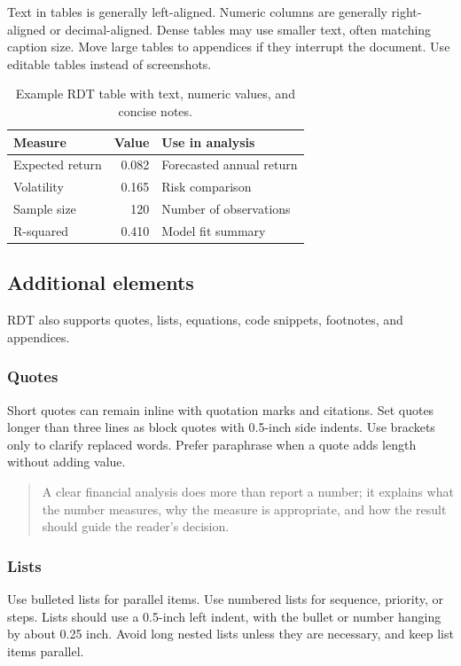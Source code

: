 \documentclass[11pt,letterpaper]{article}
\newenvironment{rdtblockquote}{\begin{quote}}{\end{quote}}
\begin{document}
Text in tables is generally left-aligned. Numeric columns are generally
right-aligned or decimal-aligned. Dense tables may use smaller text,
often matching caption size. Move large tables to appendices if they
interrupt the document. Use editable tables instead of screenshots.

\begin{table}[h]
\caption{Example RDT table with text, numeric values, and concise notes.}
\centering
\begin{tabular}{l r l}
\toprule
Measure & Value & Use in analysis \\
\midrule
Expected return & 0.082 & Forecasted annual return \\
Volatility & 0.165 & Risk comparison \\
Sample size & 120 & Number of observations \\
R-squared & 0.410 & Model fit summary \\
\bottomrule
\end{tabular}
\end{table}

\subsection{Additional elements}

RDT also supports quotes, lists, equations, code snippets, footnotes,
and appendices.

\subsubsection{Quotes}

Short quotes can remain inline with quotation marks and citations.
Set quotes longer than three lines as block quotes with 0.5-inch side
indents. Use brackets only to clarify replaced words. Prefer paraphrase
when a quote adds length without adding value.

\begin{rdtblockquote}
A clear financial analysis does more than report a number; it explains
what the number measures, why the measure is appropriate, and how the
result should guide the reader's decision.
\end{rdtblockquote}

\subsubsection{Lists}

Use bulleted lists for parallel items. Use numbered lists for sequence,
priority, or steps. Lists should use a 0.5-inch left indent, with the
bullet or number hanging by about 0.25 inch. Avoid long nested lists
unless they are necessary, and keep list items parallel.
\end{document}
